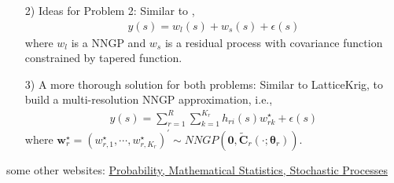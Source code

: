 \documentclass[
12pt, %
a4paper, %
oneside, %
headinclude,footinclude, %
BCOR5mm, %
]{scrartcl}
\begin{document}
\begin{itemize}
\href{https://chenyw68.github.io/Literature/[2013]identifiability)hierarchical factor models for large spatially misaligned data_ a low-rank predictive process approach.pdf}{\cite{ren2013hierarchical}},


 \item [2)] Ideas for Problem 2: Similar to \href{https://chenyw68.github.io/Literature/[2012]A full scale approximation of covariance functions for large spatial data sets.pdf}{\cite{sang2012full}},
\begin{equation}
    \begin{aligned}
       y(s) = w_l(s) + w_s(s) + \epsilon(s)
    \end{aligned} \label{DP1}
\end{equation}
where $w_l$ is a NNGP and $w_s$ is a residual process with covariance function constrained by tapered function.
 \item [3)] A more thorough solution for both problems: Similar to LatticeKrig, to build a multi-resolution NNGP approximation, i.e.,
 \begin{equation}
\begin{aligned}
y(s) = \sum_{r = 1}^{R}\sum_{k = 1}^{K_r}h_{ri}(s)w_{rk}^{\star}  + \epsilon(s)
\end{aligned} \label{DP1}
\end{equation}
where $\boldsymbol{w}_r^{\star} = \left(w_{r, 1}^{\star}, \cdots, w_{r, K_r}^{\star}\right)^\prime \sim NNGP\left(\boldsymbol{0}, \boldsymbol{\tilde{C}}_r(\cdot; \boldsymbol{\theta}_r)\right)$.
\end{itemize}


some other websites: \href{http://www.randomservices.org/random/index.html}{Probability, Mathematical Statistics, Stochastic Processes}
%

\end{document}
